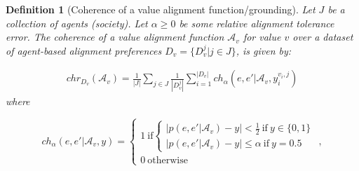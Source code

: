 \documentclass{ecai}
\newtheorem{definition}{Definition}
\newcommand{\A}{\mathcal{A}}
\newcommand{\abs}[1]{{\left|#1\right|}}
\DeclareMathOperator*{\argmax}{arg\,max}
\begin{document}

\begin{definition}[Coherence of a value alignment function/grounding]

Let $J$ be a collection of agents (society). Let $\alpha \geq 0$ be some relative alignment tolerance error. The coherence of a value alignment function $\mathcal{A}_v$ for value $v$ over a dataset of agent-based alignment preferences $D_v = \{D_v^j|j\in J\}$, is given by:


\begin{align*}
    chr_{D_v}(\mathcal{A}_v) =\frac{1}{\abs{J}} \sum_{j\in J}\frac{1}{\abs{D_v^j}}\sum_{i=1}^\abs{D_v} ch_\alpha(e,e'|\A_v, y_i^{v_i,j})
\end{align*}
where

$$
ch_\alpha(e,e'|\A_v,y) = \begin{cases}
1 \ \text{if} \begin{cases}
    \abs{p(e,e'|\A_v)-y} < \frac{1}{2}\ \text{if}\ y \in \{0,1\}\\
    \abs{p(e,e'|\A_v)-y} \leq \alpha\ \text{if}\ y =0.5
    \end{cases}\\
    0 \ \text{otherwise}
\end{cases},
    $$

\iffalse

\begin{align*}
     C^{G_V}_{\{G_V^j, j\in J\}}(P) &= \min_{v\in V} \frac{1}{\abs{P}\abs{J}} \sum_{\substack{j\in J\\e,e'\in P}}C^{G_V,G^j_V}_{v, j}(e,e')\\
    C^{G_V,G^j_V}_{v,j}(e,e') &=  \mathds{1}\left[(\A_{v}(e) - \A_{v}(e'))\cdot (\A^j_{v}(e) - \A^j_{v}(e')) > 0\right]
\end{align*}

    

    A grounding is \textbf{maximally coherent} if:
    $$G_V^* \in \argmax_{G_V}C^{G_V}_{\{G_V^j, j\in J\}}(P)$$

    A grounding $G^*_V = (\A_{v_1}, \dots, \A_{v_m})$ is \textbf{totally coherent} if $C^{G^*_V}_{\{G_V^j, j\in J\}}(P) = 1$.
\fi
\end{definition}
\end{document}
